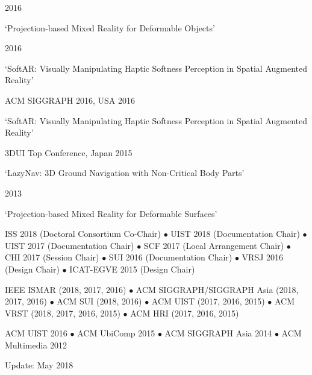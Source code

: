 \documentclass[11pt]{article} %
\begin{document}
\begin{description}
	\squish
           {}
           {2016}

    `Projection-based Mixed Reality for Deformable Objects'

           {}
           {2016}
           
	`SoftAR: Visually Manipulating Haptic Softness Perception in Spatial Augmented Reality'

           {ACM SIGGRAPH 2016, USA}
           {2016}

    `SoftAR: Visually Manipulating Haptic Softness Perception in Spatial Augmented Reality'

		   {3DUI Top Conference, Japan}
		   {2015}

	`LazyNav: 3D Ground Navigation with Non-Critical Body Parts'

		   {}
		   {2013}

	`Projection-based Mixed Reality for Deformable Surfaces'

\end{description}

\pagebreak


{}

ISS 2018 (Doctoral Consortium Co-Chair) $\bullet$ UIST 2018 (Documentation Chair) $\bullet$
UIST 2017 (Documentation Chair) $\bullet$ SCF 2017 (Local Arrangement Chair) $\bullet$ CHI 2017 (Session Chair) $\bullet$ SUI 2016 (Documentation Chair) $\bullet$ VRSJ 2016 (Design Chair) $\bullet$ ICAT-EGVE 2015 (Design Chair)

{}

IEEE ISMAR (2018, 2017, 2016) $\bullet$ ACM SIGGRAPH/SIGGRAPH Asia (2018, 2017, 2016) $\bullet$ ACM SUI (2018, 2016) $\bullet$ ACM UIST (2017, 2016, 2015) $\bullet$ ACM VRST (2018, 2017, 2016, 2015) $\bullet$ ACM HRI (2017, 2016, 2015)

{}

ACM UIST 2016 $\bullet$ ACM UbiComp 2015 $\bullet$ ACM SIGGRAPH Asia 2014 $\bullet$ ACM Multimedia 2012

	\bigskip
	\hfill \small Update: May 2018
\end{document}
